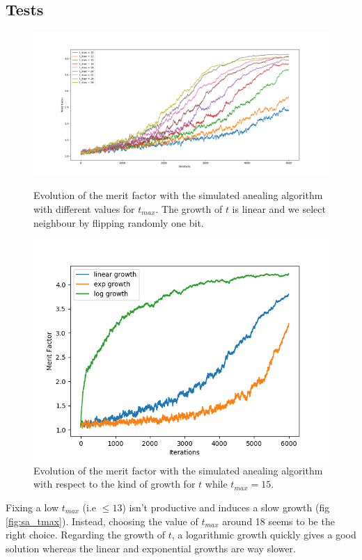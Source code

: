 \documentclass[a4paper,11pt,openany]{article}
\begin{document}
\subsection{Tests}
\begin{figure}[H]
\centering
\begin{minipage}{.45\textwidth}
  \begin{center}
  \includegraphics[scale=0.23]{Images/sa_tmax}
  \caption{Evolution of the merit factor with the simulated anealing algorithm with different values for $t_{max}$. The growth of $t$ is linear and we select neighbour by flipping randomly one bit.}
  \label{fig:sa_tmax}
  \end{center}
\end{minipage}%
\hfill
\begin{minipage}{.45\textwidth}
  \begin{center}
  \includegraphics[scale=0.4]{Images/sa_growth}
  \caption{Evolution of the merit factor with the simulated anealing algorithm with respect to the kind of growth for $t$ while $t_{max}=15$.}
  \label{fig:sa_growth}
  \end{center}
\end{minipage}
\end{figure}
\noindent
Fixing a low $t_{max}$ (i.e $\leq 13$) isn't productive and induces a slow growth (fig \ref{fig:sa_tmax}). Instead, choosing the value of $t_{max}$ around 18 seems to be the right choice. Regarding the growth of $t$, a logarithmic growth quickly gives a good solution whereas the linear and exponential growths are way slower.
\end{document}
